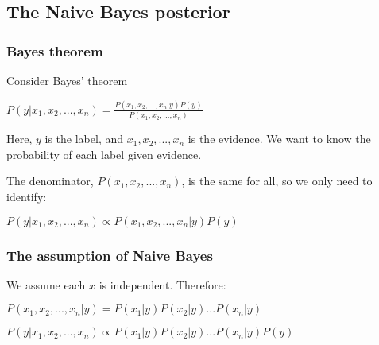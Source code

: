 
\subsection{The Naive Bayes posterior}

\subsubsection{Bayes theorem}

Consider Bayes' theorem

\(P(y|x_1,x_2,...,x_n)=\frac{P(x_1,x_2,...,x_n|y)P(y)}{P(x_1,x_2,...,x_n)}\)

Here, \(y\) is the label, and \(x_1,x_2,...,x_n\) is the evidence. We want to know the probability of each label given evidence.

The denominator, \(P(x_1,x_2,...,x_n)\), is the same for all, so we only need to identify:

\(P(y|x_1,x_2,...,x_n)\propto P(x_1,x_2,...,x_n|y)P(y)\)

\subsubsection{The assumption of Naive Bayes}

We assume each \(x\) is independent. Therefore:

\(P(x_1,x_2,...,x_n|y)=P(x_1|y)P(x_2|y)...P(x_n|y)\)

\(P(y|x_1,x_2,...,x_n)\propto P(x_1|y)P(x_2|y)...P(x_n|y)P(y)\)

